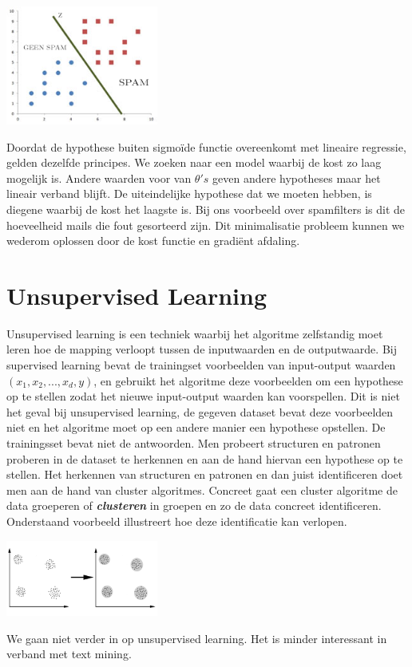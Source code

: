 \begin{center}
  \includegraphics[width=5cm]{decissionline}
\end{center}

Doordat de hypothese buiten sigmo\"ide functie overeenkomt met lineaire regressie, gelden dezelfde principes. We zoeken naar een model waarbij de kost zo laag mogelijk is. Andere waarden voor van $\theta's$ geven andere hypotheses maar het lineair verband blijft. De uiteindelijke hypothese dat we moeten hebben, is diegene waarbij de kost het laagste is. Bij ons voorbeeld over spamfilters is dit de hoeveelheid mails die fout gesorteerd zijn. Dit minimalisatie probleem kunnen we wederom oplossen door de kost functie en gradi\"ent afdaling.

\section{Unsupervised Learning}\label{Unsupervised Learning}

Unsupervised learning is een techniek waarbij het algoritme zelfstandig moet leren hoe de mapping verloopt tussen de inputwaarden en de outputwaarde. Bij supervised learning bevat de trainingset voorbeelden van input-output waarden $(x_{1},x_{2},...,x_{d},y)$, en gebruikt het algoritme deze voorbeelden om een hypothese op te stellen zodat het nieuwe input-output waarden kan voorspellen. Dit is niet het geval bij unsupervised learning, de gegeven dataset bevat deze voorbeelden niet en het algoritme moet op een andere manier een hypothese opstellen. De trainingsset bevat niet de antwoorden.
\newline
Men probeert structuren en patronen proberen in de dataset te herkennen en aan de hand hiervan een hypothese op te stellen. Het herkennen van structuren en patronen en dan juist identificeren doet men aan de hand van cluster algoritmes. Concreet gaat een cluster algoritme de data groeperen of \textbf{\textit{clusteren}} in groepen en zo de data concreet identificeren. Onderstaand voorbeeld illustreert hoe deze identificatie kan verlopen.\\
\begin{center}
  \includegraphics[width=5cm]{clustering}
\end{center}
\newline
We gaan niet verder in op unsupervised learning. Het is minder interessant in verband met text mining.
